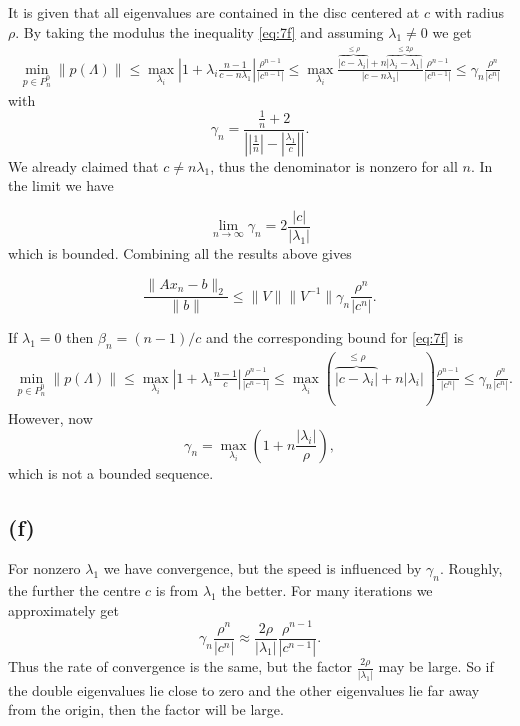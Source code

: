 It is given that all eigenvalues are contained in the disc centered at $c$ with radius $\rho$. By taking the modulus the inequality   \eqref{eq:7f} and assuming $\lambda_{1}\neq0$ we get
\begin{align*}
\min\limits_{p\in P_{n}^{0}}\|p(\Lambda)\|\leq \max\limits_{\lambda_{i}} \left|1 + \lambda_{i} \frac{n-1}{c-n\lambda_{1}}\right|\frac{\rho^{n-1}}{|c^{n-1}|} \leq \max\limits_{\lambda_{i}}\frac{\overbrace{|c-\lambda_{i}|}^{\leq \rho} + n\overbrace{|\lambda_{i}-\lambda_{1}|}^{\leq 2\rho}}{|c-n\lambda_{1}|} \frac{\rho^{n-1}}{|c^{n-1}|}\leq \gamma_{n} \frac{\rho^{n}}{|c^{n}|}
\end{align*}
with
\begin{equation}
  \gamma_{n} =\frac{\frac{1}{n} + 2}{\left||\frac{1}{n}|-|\frac{\lambda_{1}}{c}|\right|}.
\end{equation}
We already claimed that $c\neq n\lambda_{1}$, thus the denominator is nonzero for all $n$. In the limit we have

\begin{equation}
  \lim\limits_{n\rightarrow \infty} \gamma_{n} = 2\frac{|c|}{|\lambda_{1}|}
\end{equation}
which is bounded. Combining all the results above gives

\begin{equation*}
  \frac{\|Ax_{n}-b\|_{2}}{\|b\|}\leq \|V\|\|V^{-1}\| \gamma_{n} \frac{\rho^{n}}{|c^{n}|}.
\end{equation*}

If $\lambda_{1} = 0$ then $\beta_n = (n-1)/c$ and the corresponding bound for \eqref{eq:7f} is
\begin{align*}
\min\limits_{p\in P_{n}^{0}}\|p(\Lambda)\|\leq \max\limits_{\lambda_{i}} \left|1 + \lambda_{i} \frac{n-1}{c}\right|\frac{\rho^{n-1}}{|c^{n-1}|} \leq \max\limits_{\lambda_{i}}\left(\overbrace{|c-\lambda_{i}|}^{\leq \rho} + n|\lambda_{i}|\right) \frac{\rho^{n-1}}{|c^{n}|} \leq \gamma_{n} \frac{\rho^{n}}{|c^{n}|}.
\end{align*}
However, now
\begin{equation}
\gamma_{n}  = \max\limits_{\lambda_{i}}\left(1 + n\frac{|\lambda_{i}|}{\rho}\right),
\end{equation}
which is not a bounded sequence.
\subsection*{(f)}
For nonzero $\lambda_{1}$ we have convergence, but the speed is influenced by $\gamma_{n}$. Roughly, the further the centre $c$ is from $\lambda_{1}$ the better. For many iterations we approximately get
\begin{equation}
  \gamma_{n}\frac{\rho^{n}}{|c^{n}|} \approx \frac{2\rho}{|\lambda_{1}|}\frac{\rho^{n-1}}{|c^{n-1}|}.
\end{equation}
Thus the rate of convergence is the same, but the factor $\frac{2\rho}{|\lambda_{1}|}$ may be large. So if the double eigenvalues lie close to zero and the other  eigenvalues lie far away from the origin, then the factor will be large.

